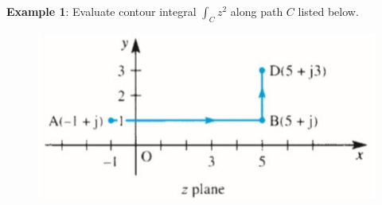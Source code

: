 \documentclass[10pt,a4paper]{article}
\begin{document}
\textbf{Example 1}: Evaluate contour integral $\int_C z^2$ along path $C$ listed below.
\begin{figure} [h!]
    \centering
    \includegraphics[scale=0.7]{Contour integral q.JPG}
    
\end{figure}
\end{document}

